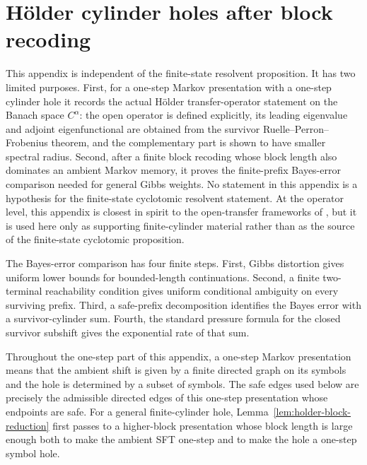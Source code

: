 
\section{H\"older cylinder holes after block recoding}
\label{app:holder-finite-cylinder}

This appendix is independent of the finite-state resolvent proposition.  It
has two limited purposes.  First, for a one-step Markov presentation with
a one-step cylinder hole it records the actual H\"older
transfer-operator statement on the Banach space
\(C^\alpha\): the open operator is defined explicitly, its leading
eigenvalue and adjoint eigenfunctional are obtained from the survivor
Ruelle--Perron--Frobenius theorem, and the complementary part is shown to
have smaller spectral radius.  Second, after a finite block recoding
whose block length also dominates an ambient Markov memory, it proves the
finite-prefix Bayes-error comparison needed for general Gibbs weights.
No statement in this appendix is a hypothesis for the finite-state
cyclotomic resolvent statement.  At the operator level, this appendix is
closest in spirit to the open-transfer frameworks of
\citet{KellerLiverani2009,FroylandStancevic2010,AtnipFroylandGonzalezTokmanVaienti2023},
but it is used here only as supporting finite-cylinder material rather
than as the source of the finite-state cyclotomic proposition.

The Bayes-error comparison has four finite steps.  First, Gibbs
distortion gives uniform lower bounds for bounded-length continuations.
Second, a finite two-terminal reachability condition gives uniform
conditional ambiguity on every surviving prefix.  Third, a safe-prefix
decomposition identifies the Bayes error with a survivor-cylinder sum.
Fourth, the standard pressure formula for the closed survivor subshift
gives the exponential rate of that sum.

Throughout the one-step part of this appendix, a one-step Markov
presentation means that the ambient shift is given by a finite directed
graph on its symbols and the hole is determined by a subset of symbols.
The safe edges used below are precisely the admissible directed edges of
this one-step presentation whose endpoints are safe.  For a general
finite-cylinder hole, Lemma~\ref{lem:holder-block-reduction} first passes
to a higher-block presentation whose block length is large enough both to
make the ambient SFT one-step and to make the hole a one-step symbol
hole.

